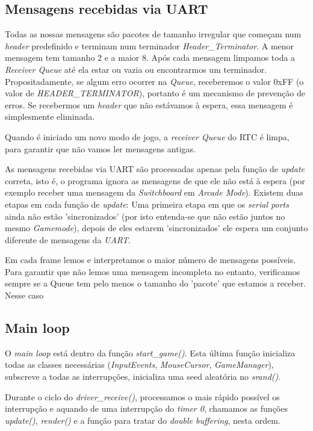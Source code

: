 \documentclass{report}
\begin{document}
\subsection{Mensagens recebidas via UART}

Todas as nossas mensagens são pacotes de tamanho irregular que começam num \textit{header} predefinido e terminam num terminador \textit{Header\_Terminator}. A menor mensagem tem tamanho 2 e a maior 8. Após cada mensagem limpamos toda a \textit{Receiver Queue} até ela estar ou vazia ou encontrarmos um terminador. Propositadamente, se algum erro ocorrer na \textit{Queue}, receberemos o valor 0xFF (o valor de \textit{HEADER\_TERMINATOR}), portanto é um mecanismo de prevenção de erros. Se recebermos um \textit{header} que não estávamos à espera, essa mensagem é simplesmente eliminada.

Quando é iniciado um novo modo de jogo, a \textit{receiver Queue} do RTC é limpa, para garantir que não vamos ler mensagens antigas.

As mensagens recebidas via UART são processadas apenas pela função de \textit{update} correta, isto é, o programa ignora as mensagens de que ele não está à espera (por exemplo receber uma mensagem da \textit{Switchboard} em \textit{Arcade Mode}).
Existem duas etapas em cada função de \textit{update}: Uma primeira etapa em que os \textit{serial ports} ainda não estão 'sincronizados' (por isto entenda-se que não estão juntos no mesmo \textit{Gamemode}), depois de eles estarem 'sincronizados' ele espera um conjunto diferente de mensagens da \textit{UART}.

Em cada frame lemos e interpretamos o maior número de mensagens possíveis. Para garantir que não lemos uma mensagem incompleta no entanto, verificamos sempre se a Queue tem pelo menos o tamanho do 'pacote' que estamos a receber. Nesse caso 

\subsection{Main loop}

O \textit{main loop} está dentro da função \textit{start\_game()}. Esta última função inicializa todas as classes necessárias (\textit{InputEvents}, \textit{MouseCursor}, \textit{GameManager}), subscreve a todas as interrupções, inicializa uma seed aleatória no \textit{srand()}.

Durante o ciclo do \textit{driver\_receive()}, processamos o mais rápido possível os interrupção e aquando de uma interrupção do \textit{timer 0}, chamamos as funções \textit{update()}, \textit{render()} e a função para tratar do \textit{double buffering}, nesta ordem.
\end{document}
